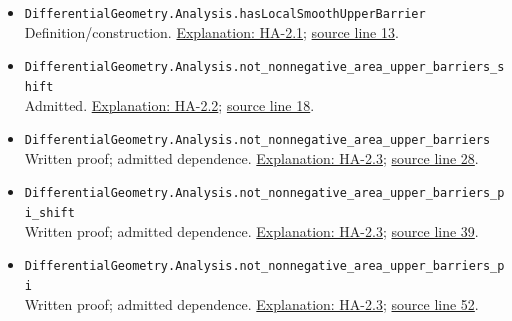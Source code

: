 \documentclass[
  letterpaper,
  11pt]{article}
\begin{document}
\begin{itemize}
\item
  {\small\texttt{Differential\allowbreak{}Geometry.\allowbreak{}Analysis.\allowbreak{}has\allowbreak{}Local\allowbreak{}Smooth\allowbreak{}Upper\allowbreak{}Barrier}}\\
  Definition/construction. \hyperref[ha-2-1]{Explanation: HA-2.1};
  \href{https://github.com/qinz1yang/differential-geometry-dev/blob/ea0fae60ee01ef8c8d9b57a51794c6538f679c5d/DifferentialGeometry/Analysis/ODE/AreaUpperBarrier.lean\#L13}{source
  line 13}.
\item
  {\small\texttt{Differential\allowbreak{}Geometry.\allowbreak{}Analysis.\allowbreak{}not\_\allowbreak{}nonnegative\_\allowbreak{}area\_\allowbreak{}upper\_\allowbreak{}barriers\_\allowbreak{}shift}}\\
  Admitted. \hyperref[ha-2-2]{Explanation: HA-2.2};
  \href{https://github.com/qinz1yang/differential-geometry-dev/blob/ea0fae60ee01ef8c8d9b57a51794c6538f679c5d/DifferentialGeometry/Analysis/ODE/AreaUpperBarrier.lean\#L18}{source
  line 18}.
\item
  {\small\texttt{Differential\allowbreak{}Geometry.\allowbreak{}Analysis.\allowbreak{}not\_\allowbreak{}nonnegative\_\allowbreak{}area\_\allowbreak{}upper\_\allowbreak{}barriers}}\\
  Written proof; admitted dependence. \hyperref[ha-2-3]{Explanation:
  HA-2.3};
  \href{https://github.com/qinz1yang/differential-geometry-dev/blob/ea0fae60ee01ef8c8d9b57a51794c6538f679c5d/DifferentialGeometry/Analysis/ODE/AreaUpperBarrier.lean\#L28}{source
  line 28}.
\item
  {\small\texttt{Differential\allowbreak{}Geometry.\allowbreak{}Analysis.\allowbreak{}not\_\allowbreak{}nonnegative\_\allowbreak{}area\_\allowbreak{}upper\_\allowbreak{}barriers\_\allowbreak{}pi\_\allowbreak{}shift}}\\
  Written proof; admitted dependence. \hyperref[ha-2-3]{Explanation:
  HA-2.3};
  \href{https://github.com/qinz1yang/differential-geometry-dev/blob/ea0fae60ee01ef8c8d9b57a51794c6538f679c5d/DifferentialGeometry/Analysis/ODE/AreaUpperBarrier.lean\#L39}{source
  line 39}.
\item
  {\small\texttt{Differential\allowbreak{}Geometry.\allowbreak{}Analysis.\allowbreak{}not\_\allowbreak{}nonnegative\_\allowbreak{}area\_\allowbreak{}upper\_\allowbreak{}barriers\_\allowbreak{}pi}}\\
  Written proof; admitted dependence. \hyperref[ha-2-3]{Explanation:
  HA-2.3};
  \href{https://github.com/qinz1yang/differential-geometry-dev/blob/ea0fae60ee01ef8c8d9b57a51794c6538f679c5d/DifferentialGeometry/Analysis/ODE/AreaUpperBarrier.lean\#L52}{source
  line 52}.
\end{itemize}
\end{document}
